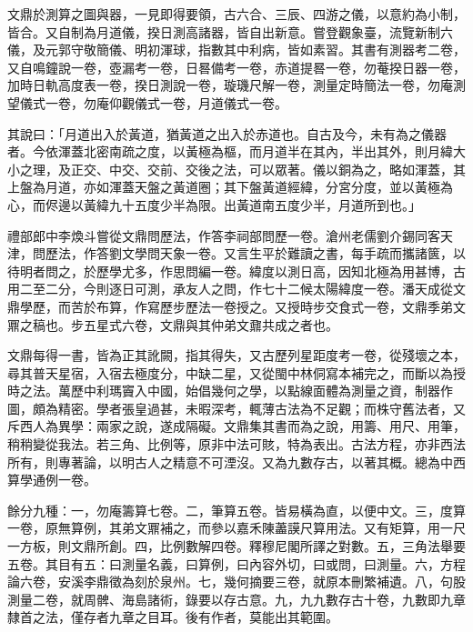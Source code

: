 \begin{pinyinscope}
文鼎於測算之圖與器，一見即得要領，古六合、三辰、四游之儀，以意約為小制，皆合。又自制為月道儀，揆日測高諸器，皆自出新意。嘗登觀象臺，流覽新制六儀，及元郭守敬簡儀、明初渾球，指數其中利病，皆如素習。其書有測器考二卷，又自鳴鐘說一卷，壺漏考一卷，日晷備考一卷，赤道提晷一卷，勿菴揆日器一卷，加時日軌高度表一卷，揆日測說一卷，璇璣尺解一卷，測量定時簡法一卷，勿庵測望儀式一卷，勿庵仰觀儀式一卷，月道儀式一卷。

其說曰：「月道出入於黃道，猶黃道之出入於赤道也。自古及今，未有為之儀器者。今依渾蓋北密南疏之度，以黃極為樞，而月道半在其內，半出其外，則月緯大小之理，及正交、中交、交前、交後之法，可以眾著。儀以銅為之，略如渾蓋，其上盤為月道，亦如渾蓋天盤之黃道圈；其下盤黃道經緯，分宮分度，並以黃極為心，而侭邊以黃緯九十五度少半為限。出黃道南五度少半，月道所到也。」

禮部郎中李煥斗嘗從文鼎問歷法，作答李祠部問歷一卷。滄州老儒劉介錫同客天津，問歷法，作答劉文學問天象一卷。又言生平於難讀之書，每手疏而攜諸篋，以待明者問之，於歷學尤多，作思問編一卷。緯度以測日高，因知北極為用甚博，古用二至二分，今則逐日可測，承友人之問，作七十二候太陽緯度一卷。潘天成從文鼎學歷，而苦於布算，作寫歷步歷法一卷授之。又授時步交食式一卷，文鼎季弟文鼏之稿也。步五星式六卷，文鼎與其仲弟文鼐共成之者也。

文鼎每得一書，皆為正其訛闕，指其得失，又古歷列星距度考一卷，從殘壞之本，尋其普天星宿，入宿去極度分，中缺二星，又從閩中林侗寫本補完之，而斷以為授時之法。萬歷中利瑪竇入中國，始倡幾何之學，以點線面體為測量之資，制器作圖，頗為精密。學者張皇過甚，未暇深考，輒薄古法為不足觀；而株守舊法者，又斥西人為異學：兩家之說，遂成隔礙。文鼎集其書而為之說，用籌、用尺、用筆，稍稍變從我法。若三角、比例等，原非中法可賅，特為表出。古法方程，亦非西法所有，則專著論，以明古人之精意不可湮沒。又為九數存古，以著其概。總為中西算學通例一卷。

餘分九種：一，勿庵籌算七卷。二，筆算五卷。皆易橫為直，以便中文。三，度算一卷，原無算例，其弟文鼏補之，而參以嘉禾陳藎謨尺算用法。又有矩算，用一尺一方板，則文鼎所創。四，比例數解四卷。釋穆尼閣所譯之對數。五，三角法舉要五卷。其目有五：曰測量名義，曰算例，曰內容外切，曰或問，曰測量。六，方程論六卷，安溪李鼎徵為刻於泉州。七，幾何摘要三卷，就原本刪繁補遺。八，句股測量二卷，就周髀、海島諸術，錄要以存古意。九，九九數存古十卷，九數即九章隸首之法，僅存者九章之目耳。後有作者，莫能出其範圍。


\end{pinyinscope}
